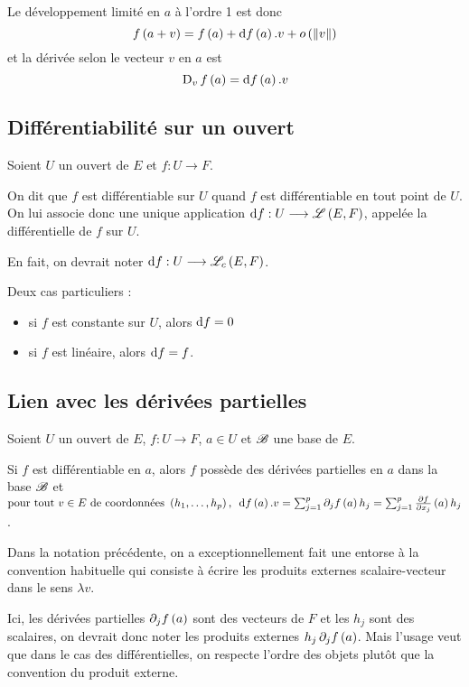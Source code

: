 Le développement limité en \(a\) à l'ordre 1 est donc \[f\paren{a+v}=f\paren{a}+\odif{f}\paren{a}.v+\o{\norme{v}}\] et la dérivée selon le vecteur \(v\) en \(a\) est \[\vdv{v}{f}\paren{a}=\odif{f}\paren{a}.v\]

\subsection{Différentiabilité sur un ouvert}

\begin{defi}
Soient \(U\) un ouvert de \(E\) et \(f:U\to F\).

On dit que \(f\) est différentiable sur \(U\) quand \(f\) est différentiable en tout point de \(U\). On lui associe donc une unique application \(\odif{f}:U\to\L{E}{F}\), appelée la différentielle de \(f\) sur \(U\).
\end{defi}

\begin{rem}
En fait, on devrait noter \(\odif{f}:U\to\Lc{E}{F}\).
\end{rem}

Deux cas particuliers :

\begin{itemize}
    \item si \(f\) est constante sur \(U\), alors \(\odif{f}=0\) \\
    \item si \(f\) est linéaire, alors \(\odif{f}=f\).
\end{itemize}

\subsection{Lien avec les dérivées partielles}

\begin{prop}
Soient \(U\) un ouvert de \(E\), \(f:U\to F\), \(a\in U\) et \(\mathscr{B}\) une base de \(E\).

Si \(f\) est différentiable en \(a\), alors \(f\) possède des dérivées partielles en \(a\) dans la base \(\mathscr{B}\) et \(\quantifs{\tpt v\in E\text{ de coordonnées }\paren{h_1,\dots,h_p}}\odif{f}\paren{a}.v=\sum_{j=1}^p\pdif{j}f\paren{a}h_j=\sum_{j=1}^p\pdv{f}{x_j}\paren{a}h_j\).
\end{prop}

\begin{rem}
Dans la notation précédente, on a exceptionnellement fait une entorse à la convention habituelle qui consiste à écrire les produits externes scalaire-vecteur dans le sens \(\lambda v\).

Ici, les dérivées partielles \(\pdif{j}f\paren{a}\) sont des vecteurs de \(F\) et les \(h_j\) sont des scalaires, on devrait donc noter les produits externes \(h_j\pdif{j}f\paren{a}\). Mais l'usage veut que dans le cas des différentielles, on respecte l'ordre des objets plutôt que la convention du produit externe.
\end{rem}

